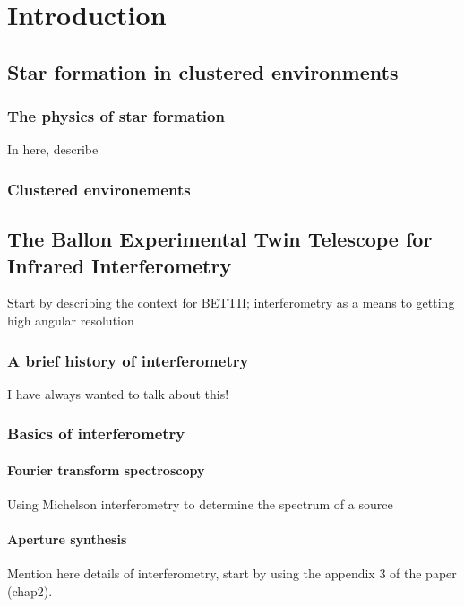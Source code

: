 
\chapter{Introduction} %

\label{chap:introduction} %



\section{Star formation in clustered environments}

\subsection{The physics of star formation}

In here, describe 

\subsection{Clustered environements}

\section{The Ballon Experimental Twin Telescope for Infrared Interferometry}

Start by describing the context for BETTII; interferometry as a means to getting high angular resolution
\subsection{A brief history of interferometry}
I have always wanted to talk about this!

\subsection{Basics of interferometry}

\subsubsection{Fourier transform spectroscopy}
Using Michelson interferometry to determine the spectrum of a source
\subsubsection{Aperture synthesis}
Mention here details of interferometry, start by using the appendix 3 of the paper (chap2). 

